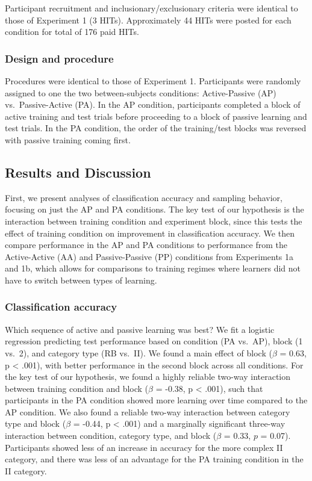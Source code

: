 \documentclass[10pt, letterpaper]{article}
\begin{document}
Participant recruitment and inclusionary/exclusionary criteria were
identical to those of Experiment 1 (3 HITs). Approximately 44 HITs were
posted for each condition for total of 176 paid HITs.

\subsubsection{Design and procedure}\label{design-and-procedure-2}

Procedures were identical to those of Experiment 1. Participants were
randomly assigned to one the two between-subjects conditions:
Active-Passive (AP) vs.~Passive-Active (PA). In the AP condition,
participants completed a block of active training and test trials before
proceeding to a block of passive learning and test trials. In the PA
condition, the order of the training/test blocks was reversed with
passive training coming first.

\subsection{Results and Discussion}\label{results-and-discussion-2}

First, we present analyses of classification accuracy and sampling
behavior, focusing on just the AP and PA conditions. The key test of our
hypothesis is the interaction between training condition and experiment
block, since this tests the effect of training condition on improvement
in classification accuracy. We then compare performance in the AP and PA
conditions to performance from the Active-Active (AA) and
Passive-Passive (PP) conditions from Experiments 1a and 1b, which allows
for comparisons to training regimes where learners did not have to
switch between types of learning.

\subsubsection{Classification accuracy}\label{classification-accuracy-2}

Which sequence of active and passive learning was best? We fit a
logistic regression predicting test performance based on condition (PA
vs.~AP), block (1 vs.~2), and category type (RB vs.~II). We found a main
effect of block (\(\beta\) = 0.63, p \textless{} .001), with better
performance in the second block across all conditions. For the key test
of our hypothesis, we found a highly reliable two-way interaction
between training condition and block (\(\beta\) = -0.38, p \textless{}
.001), such that participants in the PA condition showed more learning
over time compared to the AP condition. We also found a reliable two-way
interaction between category type and block (\(\beta\) = -0.44, p
\textless{} .001) and a marginally significant three-way interaction
between condition, category type, and block (\(\beta\) = 0.33, \(p\) =
0.07). Participants showed less of an increase in accuracy for the more
complex II category, and there was less of an advantage for the PA
training condition in the II category.
\end{document}
